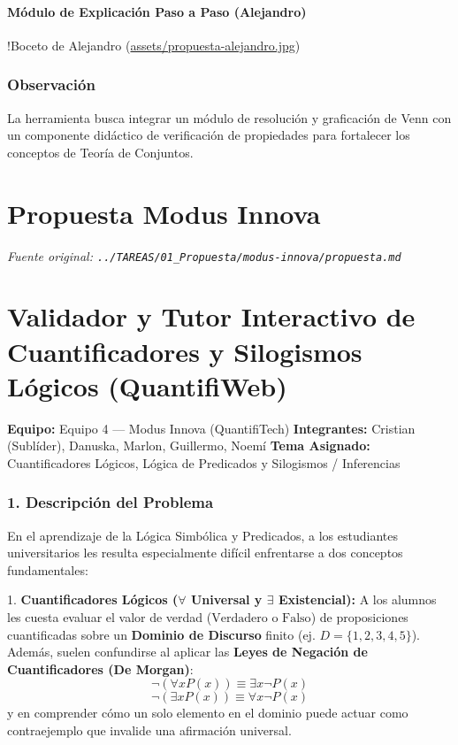 \documentclass[11pt,a4paper,openany]{book}
\begin{document}
\paragraph{Módulo de Explicación Paso a Paso (Alejandro)}
!Boceto de Alejandro (\url{assets/propuesta-alejandro.jpg})

\hrulefill

\subsubsection{Observación}

La herramienta busca integrar un módulo de resolución y graficación de Venn con un componente didáctico de verificación de propiedades para fortalecer los conceptos de Teoría de Conjuntos.

\section{Propuesta Modus Innova}
\textit{Fuente original: \texttt{../TAREAS/01\_Propuesta/modus-innova/propuesta.md}}

\section{Validador y Tutor Interactivo de Cuantificadores y Silogismos Lógicos (QuantifiWeb)}

\textbf{Equipo:} Equipo 4 --- Modus Innova (QuantifiTech)
\textbf{Integrantes:} Cristian (Sublíder), Danuska, Marlon, Guillermo, Noemí
\textbf{Tema Asignado:} Cuantificadores Lógicos, Lógica de Predicados y Silogismos / Inferencias

\hrulefill

\subsubsection{1. Descripción del Problema}
En el aprendizaje de la Lógica Simbólica y Predicados, a los estudiantes universitarios les resulta especialmente difícil enfrentarse a dos conceptos fundamentales:

1. \textbf{Cuantificadores Lógicos ($\forall$ Universal y $\exists$ Existencial):}
   A los alumnos les cuesta evaluar el valor de verdad ($\text{Verdadero}$ o $\text{Falso}$) de proposiciones cuantificadas sobre un \textbf{Dominio de Discurso} finito (ej. $D = \{1, 2, 3, 4, 5\}$). Además, suelen confundirse al aplicar las \textbf{Leyes de Negación de Cuantificadores (De Morgan)}:
   $$\neg (\forall x P(x)) \equiv \exists x \neg P(x)$$
   $$\neg (\exists x P(x)) \equiv \forall x \neg P(x)$$
   y en comprender cómo un solo elemento en el dominio puede actuar como contraejemplo que invalide una afirmación universal.
\end{document}

